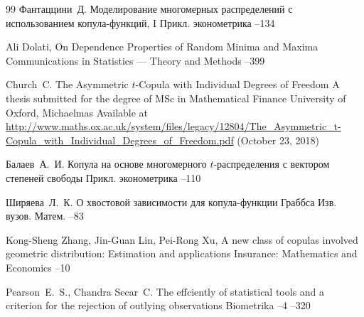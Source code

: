 \begin{thebibliography}{99}
\by Фантаццини~Д.
\paper Моделирование многомерных распределений с использованием копула-функций,  I
\jour Прикл. эконометрика  
--134 


\by  Ali Dolati,  
\paper On Dependence Properties of Random Minima and Maxima
\jour Communications in Statistics --- Theory and Methods  
--399 


\by Church~C.
\thesis The Asymmetric $t$-Copula with Individual Degrees of Freedom
\thesisinfo A thesis submitted for the degree of MSc in Mathematical Finance
\publaddr University of Oxford, Michaelmas 
\elink Available at \url{http://www.maths.ox.ac.uk/system/files/legacy/12804/The_Asymmetric_t-Copula_with_Individual_Degrees_of_Freedom.pdf} (October 23, 2018) 

\by Балаев~А.~И. 
\paper Копула на основе многомерного $t$-распределения с вектором степеней свободы
\jour Прикл. эконометрика  
--110 


\by Ширяева~Л.~К.
\paper О хвостовой зависимости для копула-функции Граббса
\jour Изв. вузов. Матем.
--83


\by Kong-Sheng Zhang, Jin-Guan Lin, Pei-Rong Xu,
\paper A new class of copulas involved geometric distribution: Estimation and applications
\jour Insurance: Mathematics and Economics 
--10 


\by  Pearson~E.~S., Chandra Secar~C. 
\paper The effciently of statistical tools and a criterion for the rejection of outlying observations
\jour Biometrika
--4
–320




\end{thebibliography}
